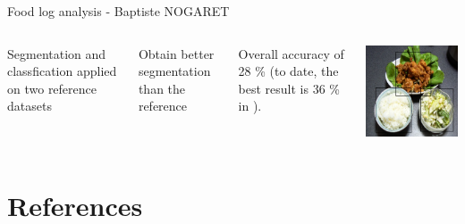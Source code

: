 \documentclass[aspectratio=169]{beamer}
\let\oldsection\section
\renewcommand{\section}[1]{
    \oldsection{#1}	
    \subsection{}
}
\newenvironment{myframe}[1][t]{\begin{frame}[#1]{\secname}{\subsecname}}{\end{frame}}
\begin{document}
    {
        \begin{frame}{Food log analysis - Baptiste NOGARET}{}
            \begin{columns}
                Segmentation and classfication applied on two reference datasets
                
                \vspace{0.5cm}
                
                Obtain better segmentation than the reference
                
                \vspace{0.5cm}
                
                Overall accuracy of 28 \% (to date, the best result is 36 \% in \cite{Bolanos2016}).
                
                \centering
                \includegraphics[scale=0.5]{../img/seg_97_gt}
            \end{columns}
        \end{frame}
    }
    
    \section{References}
    
    \begin{myframe}[t, allowframebreaks]
        \printbibliography[heading=none]
    \end{myframe}
   
\end{document}
